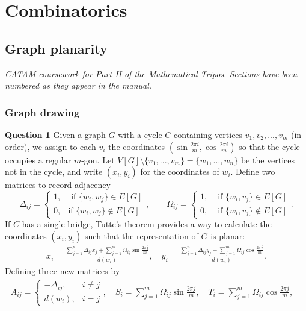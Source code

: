 \documentclass[12pt]{article}
\begin{document}
\setcounter{section}{16}
\section{Combinatorics}
\setcounter{subsection}{6}
\subsection{Graph planarity}
\emph{CATAM coursework for Part II of the Mathematical Tripos. Sections have
been numbered as they appear in the manual.}

\subsubsection{Graph drawing}
\textbf{Question 1}\quad 
Given a graph \(G\) with a cycle \(C\) containing vertices \(v_1,v_2,...,v_m\)
(in order), we assign to each \(v_i\) the coordinates \((\sin \frac{2\pi i}{m},
\cos\frac{2\pi i}{m})\) so that the cycle occupies a regular \(m\)-gon. Let
\(V[G]\setminus\{v_1,...,v_m\}=\{w_1,...,w_n\}\) be the vertices not in the
cycle, and  write \((x_i,y_i)\) for the coordinates of \(w_i\). Define two
matrices to record adjacency
\[\Delta_{ij} = \begin{cases} 1, &\text{ if }\{w_i,w_j\}\in E[G] \\ 0, &\text{
    if }\{w_i,w_j\}\notin E[G] \end{cases}, \qquad \Omega_{ij} = \begin{cases} 1, &\text{ if }\{w_i,v_j\}\in E[G] \\ 0, &\text{ if }\{w_i,v_j\}\notin E[G] \end{cases}.\]
If \(C\) has a single bridge, Tutte's theorem provides a way to calculate the
coordinates \((x_i,y_i)\) such that the representation of \(G\) is planar: 
\begin{gather*}
    x_i = \frac{\sum_{j=1}^n \Delta_{ij}x_j + \sum_{j=1}^m
\Omega_{ij}\sin \frac{2\pi j}{m} }{d(w_i)}, \quad 
    y_i = \frac{\sum_{j=1}^n \Delta_{ij}y_j + \sum_{j=1}^m
\Omega_{ij}\cos \frac{2\pi j}{m} }{d(w_i)}.
\end{gather*}
Defining three new matrices by 
\begin{gather*}
    A_{ij}=\begin{cases}-\Delta_{ij}, &i\neq j\\ 
    d(w_i), &i=j\end{cases}, \quad
    S_i = \sum_{j=1}^m \Omega_{ij}\sin\frac{2\pi j}{m}, \quad
    T_i = \sum_{j=1}^m \Omega_{ij}\cos\frac{2\pi j}{m}, \quad
\end{gather*}
\end{document}
